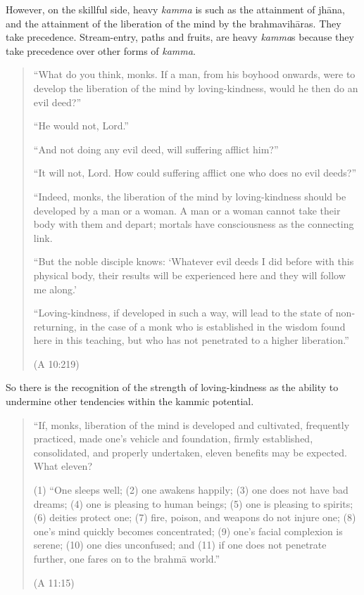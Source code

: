 However, on the skillful side, heavy \emph{kamma} is such as the
attainment of jhāna, and the attainment of the liberation of the mind by
the brahmavihāras. They take precedence. Stream-entry, paths and fruits,
are heavy \emph{kamma}s because they take precedence over other forms of
\emph{kamma}.

\begin{quotation}
“What do you think, monks. If a man, from his boyhood onwards, were to
develop the liberation of the mind by loving-kindness, would he then do
an evil deed?”

“He would not, Lord.”

“And not doing any evil deed, will suffering afflict him?”

“It will not, Lord. How could suffering afflict one who does no evil
deeds?”

“Indeed, monks, the liberation of the mind by loving-kindness should be
developed by a man or a woman. A man or a woman cannot take their body
with them and depart; mortals have consciousness as the connecting link.

“But the noble disciple knows: ‘Whatever evil deeds I did before with
this physical body, their results will be experienced here and they will
follow me along.’

“Loving-kindness, if developed in such a way, will lead to the state of
non-returning, in the case of a monk who is established in the wisdom
found here in this teaching, but who has not penetrated to a higher
liberation.”

\hspace*{\fill}(A 10:219)
\end{quotation}

So there is the recognition of the strength of loving-kindness as the
ability to undermine other tendencies within the kammic potential.

\begin{quotation}
“If, monks, liberation of the mind is developed and cultivated,
frequently practiced, made one’s vehicle and foundation, firmly
established, consolidated, and properly undertaken, eleven benefits may
be expected. What eleven?

(1) “One sleeps well; (2) one awakens happily; (3) one does not have bad
dreams; (4) one is pleasing to human beings; (5) one is pleasing to
spirits; (6) deities protect one; (7) fire, poison, and weapons do not
injure one; (8) one’s mind quickly becomes concentrated; (9) one’s
facial complexion is serene; (10) one dies unconfused; and (11) if one
does not penetrate further, one fares on to the brahmā world.”

\hspace*{\fill}(A 11:15)
\end{quotation}

